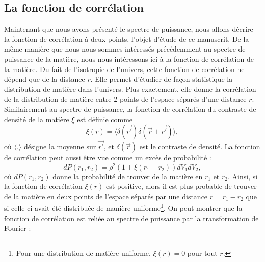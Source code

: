 \documentclass[11pt, twoside, a4paper, openright]{report}
\begin{document}
\subsection{La fonction de corrélation}


Maintenant que nous avons présenté le spectre de puissance, nous allons décrire la fonction de corrélation à deux points, l'objet d'étude de ce manuscrit. De la même manière que nous nous sommes intéressés précédemment au spectre de puissance de la matière, nous nous intéressons ici à la fonction de corrélation de la matière. Du fait de l'isotropie de l'univers, cette fonction de corrélation ne dépend que de la distance $r$. Elle permet d'étudier de façon statistique la distribution de matière dans l'univers. Plus exactement, elle donne la corrélation de la distribution de matière entre 2 points de l'espace séparés d'une distance $r$. Similairement au spectre de puissance, la fonction de corrélation du contraste de densité de la matière $\xi$ est définie comme
\begin{equation}
  \label{eq:def_cf}
  \xi(r) = \langle \delta(\vec{r'}) \delta(\vec{r} + \vec{r'}) \rangle,
\end{equation}
où $\langle.\rangle$ désigne la moyenne sur $\vec{r'}$, et $\delta(\vec{r})$ est le contraste de densité.
La fonction de corrélation peut aussi être vue comme un excès de probabilité :
\begin{equation}
  \label{eq:def_cf2}
  dP(r_{1}, r_{2}) = \bar \rho^{2} ( 1 + \xi(r_{1} - r_{2})) dV_{1} dV_{2} ,
\end{equation}
où $dP(r_{1}, r_{2})$ donne la probabilité de trouver de la matière en $r_{1}$ et $r_{2}$.
Ainsi, si la fonction de corrélation $\xi(r)$ est positive, alors il est plus probable de trouver de la matière en deux points de l'espace séparés par une distance $r = r_{1} - r_{2}$ que si celle-ci avait été distribuée de manière uniforme\footnote{Pour une distribution de matière uniforme, $\xi(r) = 0$ pour tout $r$.}.
On peut montrer que la fonction de corrélation est reliée au spectre de puissance par la transformation de Fourier :
\end{document}
